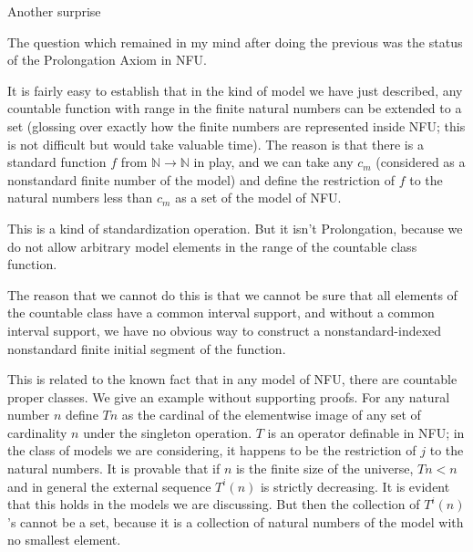 \documentclass{slides}
\begin{document}
\begin{slide}

{\Large Another surprise}

The question which remained in my mind after doing the previous was the status of the Prolongation Axiom in NFU.

It is fairly easy to establish that in the kind of model we have just described, any countable function with range in the finite natural numbers can be extended to a set (glossing over exactly how the finite numbers are represented inside NFU;  this is not difficult but would take valuable time).  The reason is that there is a standard function $f$  from $\mathbb N \rightarrow \mathbb N$ in play, and we can take any $c_m$ (considered as a nonstandard finite number of the model) and define the restriction of $f$ to the natural numbers less than $c_m$ as a set of the model of NFU.

\end{slide}

\begin{slide}

This is a kind of standardization operation.  But it isn't Prolongation, because we do not allow arbitrary model elements in the range of the countable class function.

The reason that we cannot do this is that we cannot be sure that all elements of the countable class have a common interval support, and without a common interval support, we have no obvious way to construct a nonstandard-indexed nonstandard finite initial segment of the function.

\end{slide}

\begin{slide}

This is related to the known fact that in any model of NFU, there are countable proper classes.  We give an example without supporting proofs.  For any natural number $n$ define $Tn$ as the cardinal of the elementwise image of any set of cardinality $n$ under the singleton operation.  $T$ is an operator definable in NFU;  in the class of models we are considering, it happens to be the restriction of $j$ to the natural numbers.  It is provable that if $n$ is the finite size of the universe, $Tn<n$ and in general the external sequence $T^i(n)$ is strictly decreasing.  It is evident that this holds in the models we are discussing.   But then the collection of $T^i(n)$'s cannot be a set, because it is a collection of natural numbers of the model with no smallest element.

\end{slide}
\end{document}
